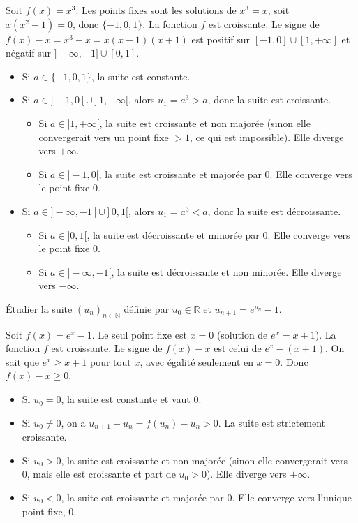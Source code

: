 \documentclass[solutions]{exercices}
\begin{document}
\begin{solution}
Soit $f(x)=x^3$. Les points fixes sont les solutions de $x^3=x$, soit $x(x^2-1)=0$, donc $\{-1, 0, 1\}$.
La fonction $f$ est croissante. Le signe de $f(x)-x=x^3-x=x(x-1)(x+1)$ est positif sur $[-1,0] \cup [1, +\infty]$ et négatif sur $]-\infty, -1] \cup [0,1]$.
\begin{itemize}
    \item Si $a \in \{-1, 0, 1\}$, la suite est constante.
    \item Si $a \in ]-1, 0[ \cup ]1, +\infty[$, alors $u_1 = a^3 > a$, donc la suite est croissante.
        \begin{itemize}
            \item Si $a \in ]1, +\infty[$, la suite est croissante et non majorée (sinon elle convergerait vers un point fixe $>1$, ce qui est impossible). Elle diverge vers $+\infty$.
            \item Si $a \in ]-1, 0[$, la suite est croissante et majorée par 0. Elle converge vers le point fixe 0.
        \end{itemize}
    \item Si $a \in ]-\infty, -1[ \cup ]0, 1[$, alors $u_1 = a^3 < a$, donc la suite est décroissante.
        \begin{itemize}
            \item Si $a \in ]0, 1[$, la suite est décroissante et minorée par 0. Elle converge vers le point fixe 0.
            \item Si $a \in ]-\infty, -1[$, la suite est décroissante et non minorée. Elle diverge vers $-\infty$.
        \end{itemize}
\end{itemize}
\end{solution}

\begin{exercice}
\'Etudier la suite $(u_n)_{n \in \mathbb{N}}$ définie par $u_0\in\mathbb{R}$ et $u_{n+1}=e^{u_n}-1$.
\end{exercice}

\begin{solution}
Soit $f(x)=e^x-1$. Le seul point fixe est $x=0$ (solution de $e^x=x+1$).
La fonction $f$ est croissante. Le signe de $f(x)-x$ est celui de $e^x-(x+1)$. On sait que $e^x \ge x+1$ pour tout $x$, avec égalité seulement en $x=0$. Donc $f(x)-x \ge 0$.
\begin{itemize}
    \item Si $u_0=0$, la suite est constante et vaut 0.
    \item Si $u_0 \ne 0$, on a $u_{n+1}-u_n = f(u_n)-u_n > 0$. La suite est strictement croissante.
    \item Si $u_0 > 0$, la suite est croissante et non majorée (sinon elle convergerait vers 0, mais elle est croissante et part de $u_0>0$). Elle diverge vers $+\infty$.
    \item Si $u_0 < 0$, la suite est croissante et majorée par 0. Elle converge vers l'unique point fixe, 0.
\end{itemize}
\end{solution}
\end{document}
